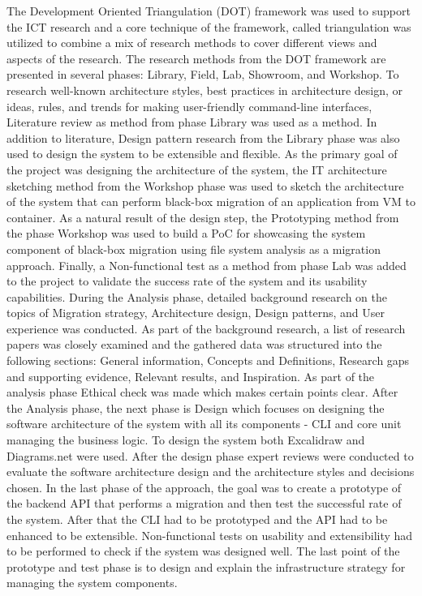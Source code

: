 \documentclass{article}
\begin{document}
\begin{multicols}{2}
The Development Oriented Triangulation (DOT) framework was used to support the ICT research and a core technique of the framework, called triangulation was utilized to combine a mix of research methods to cover different views and aspects of the research. The research methods from the DOT framework are presented in several phases: Library, Field, Lab, Showroom, and Workshop. To research well-known architecture styles, best practices in architecture design, or ideas, rules, and trends for making user-friendly command-line interfaces, Literature review as method from phase Library was used as a method. In addition to literature, Design pattern research from the Library phase was also used to design the system to be extensible and flexible. As the primary goal of the project was designing the architecture of the system, the IT architecture sketching method from the Workshop phase was used to sketch the architecture of the system that can perform black-box migration of an application from VM to container. As a natural result of the design step, the Prototyping method from the phase Workshop was used to build a PoC for showcasing the system component of black-box migration using file system analysis as a migration approach. Finally, a Non-functional test as a method from phase Lab was added to the project to validate the success rate of the system and its usability capabilities.
During the Analysis phase, detailed background research on the topics of Migration strategy, Architecture design, Design patterns, and User experience was conducted. As part of the background research, a list of research papers was closely examined and the gathered data was structured into the following sections: General information, Concepts and Definitions, Research gaps and supporting evidence, Relevant results, and Inspiration. As part of the analysis phase Ethical check was made which makes certain points clear. After the Analysis phase, the next phase is Design which focuses on designing the software architecture of the system with all its components - CLI and core unit managing the business logic. To design the system both Excalidraw and Diagrams.net were used. After the design phase expert reviews were conducted to evaluate the software architecture design and the architecture styles and decisions chosen. In the last phase of the approach, the goal was to create a prototype of the backend API that performs a migration and then test the successful rate of the system. After that the CLI had to be prototyped and the API had to be enhanced to be extensible. Non-functional tests on usability and extensibility had to be performed to check if the system was designed well. The last point of the prototype and test phase is to design and explain the infrastructure strategy for managing the system components.


\end{multicols}
\end{document}
